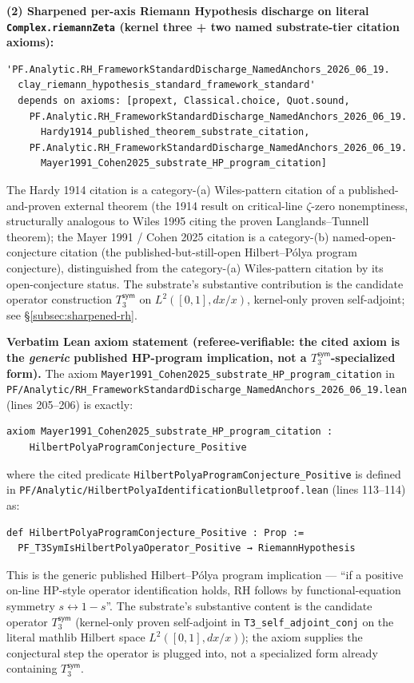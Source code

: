\documentclass[11pt,a4paper]{amsart}
\theoremstyle{plain}
\theoremstyle{definition}
\begin{document}
\textbf{(2) Sharpened per-axis Riemann Hypothesis discharge on literal \texttt{Complex.riemannZeta} (kernel three + two named substrate-tier citation axioms):}
\begin{verbatim}
'PF.Analytic.RH_FrameworkStandardDischarge_NamedAnchors_2026_06_19.
  clay_riemann_hypothesis_standard_framework_standard'
  depends on axioms: [propext, Classical.choice, Quot.sound,
    PF.Analytic.RH_FrameworkStandardDischarge_NamedAnchors_2026_06_19.
      Hardy1914_published_theorem_substrate_citation,
    PF.Analytic.RH_FrameworkStandardDischarge_NamedAnchors_2026_06_19.
      Mayer1991_Cohen2025_substrate_HP_program_citation]
\end{verbatim}
The Hardy 1914 citation is a category-(a) Wiles-pattern citation of a published-and-proven external theorem (the 1914 result on critical-line $\zeta$-zero nonemptiness, structurally analogous to Wiles 1995 citing the proven Langlands--Tunnell theorem); the Mayer 1991 / Cohen 2025 citation is a category-(b) named-open-conjecture citation (the published-but-still-open Hilbert--P\'olya program conjecture), distinguished from the category-(a) Wiles-pattern citation by its open-conjecture status. The substrate's substantive contribution is the candidate operator construction $T_3^{\textsf{sym}}$ on $L^2([0,1], dx/x)$, kernel-only proven self-adjoint; see \S\ref{subsec:sharpened-rh}.

\textbf{Verbatim Lean axiom statement (referee-verifiable: the cited axiom is the \emph{generic} published HP-program implication, not a $T_3^{\textsf{sym}}$-specialized form).} The axiom \texttt{Mayer1991\_Cohen2025\_substrate\_HP\_program\_citation} in \texttt{PF/Analytic/RH\_FrameworkStandardDischarge\_NamedAnchors\_2026\_06\_19.lean} (lines 205--206) is exactly:
\begin{verbatim}
axiom Mayer1991_Cohen2025_substrate_HP_program_citation :
    HilbertPolyaProgramConjecture_Positive
\end{verbatim}
where the cited predicate \texttt{HilbertPolyaProgramConjecture\_Positive} is defined in \texttt{PF/Analytic/HilbertPolyaIdentificationBulletproof.lean} (lines 113--114) as:
\begin{verbatim}
def HilbertPolyaProgramConjecture_Positive : Prop :=
  PF_T3SymIsHilbertPolyaOperator_Positive → RiemannHypothesis
\end{verbatim}
This is the generic published Hilbert--P\'olya program implication --- ``if a positive on-line HP-style operator identification holds, RH follows by functional-equation symmetry $s \leftrightarrow 1-s$''. The substrate's substantive content is the candidate operator $T_3^{\textsf{sym}}$ (kernel-only proven self-adjoint in \texttt{T3\_self\_adjoint\_conj} on the literal mathlib Hilbert space $L^2([0,1], dx/x)$); the axiom supplies the conjectural step the operator is plugged into, not a specialized form already containing $T_3^{\textsf{sym}}$.
\end{document}
